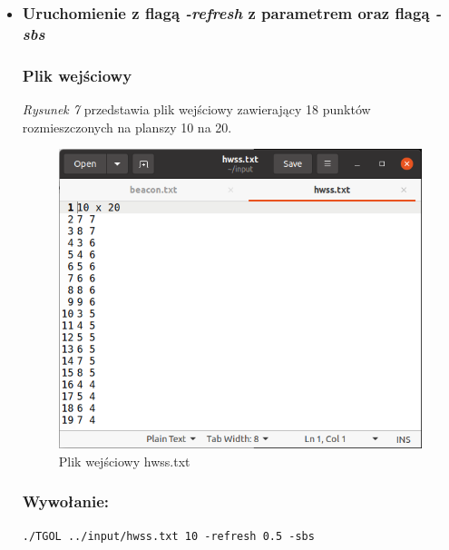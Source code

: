 \documentclass[11pt,a4paper]{report}
\begin{document}
\begin {itemize}
\item \subsubsection {Uruchomienie z flagą  \textsl{\textbf{-refresh}} z parametrem oraz flagą  \textsl{\textbf{-sbs}}}
\subsubsection {Plik wejściowy}
\textsl{Rysunek 7} przedstawia plik wejściowy zawierający 18 punktów rozmieszczonych na planszy 10 na 20.
\begin{figure}[!ht]
\centerline{\includegraphics{img/input_hwss.png}}
\caption{Plik wejściowy hwss.txt}
\end{figure}
\subsubsection {Wywołanie:}
\texttt{./TGOL ../input/hwss.txt 10 -refresh 0.5 -sbs}

\end{itemize}
\end{document}
